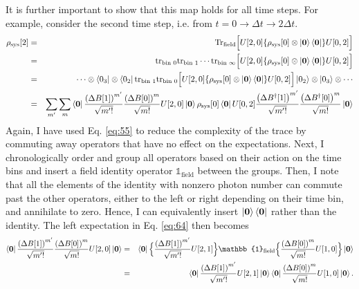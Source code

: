 \documentclass[%
 onecolumn,
 notitlepage,
 longbibliography,
 amsmath,amssymb,
 aps,
 pra,
 10pt,
]{revtex4-1}
\begin{document}
It is further important to show that this map holds for all time steps. For example, consider the second time step, i.e. from $t=0\rightarrow\Delta t\rightarrow 2\Delta t$.
\begin{eqnarray}
\rho_\text{sys}[2]&=&\text{Tr}_\text{field}\Big[U[2,0]\{\rho_\text{sys}[0]\otimes\ket{\mathbf{0}}\bra{\mathbf{0}}\}U[0,2]\Big]\\
&=&\text{tr}_\text{bin 0}\text{tr}_\text{bin 1}\cdots\text{tr}_{\text{bin }\infty}\Big[U[2,0]\{\rho_\text{sys}[0]\otimes\ket{\mathbf{0}}\bra{\mathbf{0}}\}U[0,2]\Big]\\
&=&\cdots\otimes\bra{0_3}\otimes\bra{0_2}\text{tr}_\text{bin 1}\text{tr}_\text{bin 0}\Big[U[2,0]\{\rho_\text{sys}[0]\otimes\ket{\mathbf{0}}\bra{\mathbf{0}}\}U[0,2]\Big]\ket{0_2}\otimes\ket{0_3}\otimes\cdots\\
&=&\sum_{m'}\sum_m \bra{\mathbf{0}}\frac{\left(\Delta B[1]\right)^{m'}}{\sqrt{m'!}} \frac{\left(\Delta B[0]\right)^m}{\sqrt{m!}}U[2,0]\ket{\mathbf{0}}\rho_\text{sys}[0]\bra{\mathbf{0}}U[0,2]\frac{\left(\Delta B^\dagger[1]\right)^{m'}}{\sqrt{m'!}}\frac{\left(\Delta B^\dagger[0]\right)^m}{\sqrt{m!}}\ket{\mathbf{0}}\label{eq:64}
\end{eqnarray}
Again, I have used Eq. \ref{eq:55} to reduce the complexity of the trace by commuting away operators that have no effect on the expectations. Next, I chronologically order and group all operators based on their action on the time bins and insert a field identity operator $\mathbb{1}_\text{field}$ between the groups. Then, I note that all the elements of the identity with nonzero photon number can commute past the other operators, either to the left or right depending on their time bin, and annihilate to zero. Hence, I can equivalently insert $\ket{\mathbf{0}}\bra{\mathbf{0}}$ rather than the identity. The left expectation in Eq. \ref{eq:64} then becomes
\begin{eqnarray}
\bra{\mathbf{0}}\frac{\left(\Delta B[1]\right)^{m'}}{\sqrt{m'!}} \frac{\left(\Delta B[0]\right)^m}{\sqrt{m!}}U[2,0]\ket{\mathbf{0}}&=&\bra{\mathbf{0}}\Big\{\frac{\left(\Delta B[1]\right)^{m'}}{\sqrt{m'!}}U[2,1]\Big\}\mathbb{1}_\text{field}\Big\{\frac{\left(\Delta B[0]\right)^m}{\sqrt{m!}}U[1,0]\Big\}\ket{\mathbf{0}}\\
&=&\bra{\mathbf{0}}\frac{\left(\Delta B[1]\right)^{m'}}{\sqrt{m'!}}U[2,1]\ket{\mathbf{0}}\bra{\mathbf{0}}\frac{\left(\Delta B[0]\right)^m}{\sqrt{m!}}U[1,0]\ket{\mathbf{0}}.
\end{eqnarray}
\end{document}
